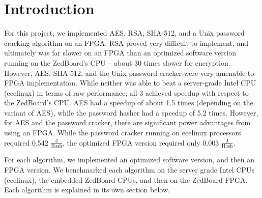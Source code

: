 \section{Introduction}
For this project, we implemented AES, RSA, SHA-512, and a Unix password cracking algorithm on an FPGA.
RSA proved very difficult to implement, and ultimately was far slower on an FPGA than an optimized software
version running on the ZedBoard's CPU -- about 30 times slower for encryption.
However, AES, SHA-512, and the Unix password cracker were very amenable
to FPGA implementation. While neither was able to beat a server-grade Intel CPU (ecelinux) in terms of raw performance,
all 3 achieved speedup with respect to the ZedBoard's CPU. AES had a speedup of about 1.5 times (depending on the variant of AES),
while the password hasher had a speedup of 5.2 times.
However, for AES and the password cracker, there are significant power advantages from using an FPGA.
While the password cracker running on ecelinux processors required 0.542 $\frac{\text{J}}{\text{Hash}}$, the optimized
FPGA version required only 0.003 $\frac{\text{J}}{\text{Hash}}$.

For each algorithm, we implemented an optimized software version, and then an FPGA version.
We benchmarked each algorithm on the server grade Intel CPUs (ecelinux), the embedded ZedBoard CPUs,
and then on the ZedBoard FPGA. Each algorithm is explained in its own section below.

